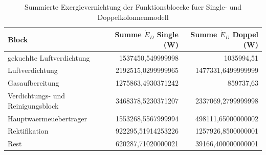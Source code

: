 \begin{longtable}{lrr}
\caption{Summierte Exergievernichtung der Funktionsbloecke fuer Single- und Doppelkolonnenmodell} \\
\hline
Block & Summe $\dot{E}_D$ Single (W) & Summe $\dot{E}_D$ Doppel (W) \\
\hline
gekuehlte Luftverdichtung & 1537450,549999998 & 1035994,51 \\
Luftverdichtung & 2192515,0299999965 & 1477331,6499999999 \\
Gasaufbereitung & 1275863,4930371242 & 859737,63 \\
Verdichtungs- und Reinigungsblock & 3468378,5230371207 & 2337069,2799999998 \\
Hauptwaermeuebertrager & 1553268,5567999994 & 498111,65000000002 \\
Rektifikation & 922295,51914253226 & 1257926,8500000001 \\
Rest & 620287,71020000021 & 39166,400000000001 \\
\hline
\end{longtable}